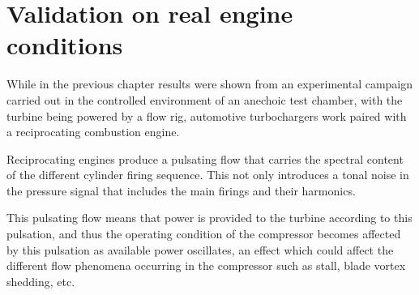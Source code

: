 \chapter{Validation on real engine conditions}
\label{cap:engine}


While in the previous chapter results were shown from an experimental campaign carried out in the controlled environment of an anechoic test chamber, with the turbine being powered by a flow rig, automotive turbochargers work paired with a reciprocating combustion engine.

Reciprocating engines produce a pulsating flow that carries the spectral content of the different cylinder firing sequence. This not only introduces a tonal noise in the pressure signal that includes the main firings and their harmonics.

This pulsating flow means that power is provided to the turbine according to this pulsation, and thus the operating condition of the compressor becomes affected by this pulsation as available power oscillates, an effect which could affect the different flow phenomena occurring in the compressor such as stall, blade vortex shedding, etc.

